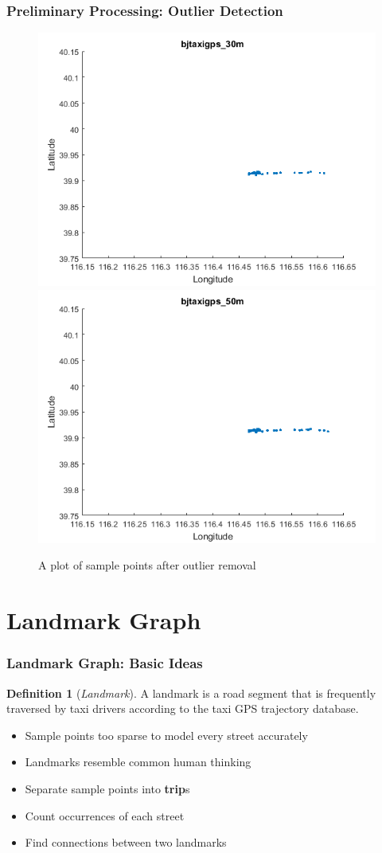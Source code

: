 \documentclass{beamer}
\theoremstyle{definition}
\newtheorem{defn}{Definition}
\begin{document}
\begin{frame}
\frametitle{Preliminary Processing: Outlier Detection}

\begin{figure}[h!]
\includegraphics[width = 0.5\linewidth]{bjtaxigps_30m} 
\includegraphics[width = 0.5\linewidth]{bjtaxigps_50m} 
\caption{A plot of sample points after outlier removal}\label{Fig:after_removal}
\end{figure}
\end{frame}

\section{Landmark Graph}

\begin{frame}
\frametitle{Landmark Graph: Basic Ideas}

\begin{defn}[\emph{Landmark}]\label{Def:ldmk}
A landmark is a road segment that is frequently traversed by taxi drivers according to the taxi GPS trajectory database. 
\end{defn}
\begin{itemize}
	\item <2-> Sample points too sparse to model every street accurately
	\item <3-> Landmarks resemble common human thinking
\end{itemize}

\begin{itemize}
	\item <4-> Separate sample points into \textbf{trip}s
	\item <5-> Count occurrences of each street
	\item <6-> Find connections between two landmarks
\end{itemize}

\end{frame}
\end{document}
